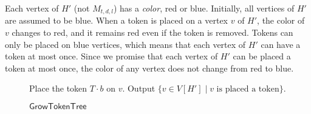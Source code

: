 \documentclass[runningheads]{llncs}
\theoremstyle{plain}
\theoremstyle{definition}
\begin{document}

Each vertex of $H'$ (not $M_{t, d, l}$) has a \emph{color}, red or blue. Initially, all vertices of $H'$ are assumed to be blue. When a token is placed on a vertex $v$ of $H'$, the color of $v$ changes to red, and it remains red even if the token is removed. Tokens can only be placed on blue vertices, which means that each vertex of $H'$ can have a token at most once. Since we promise that each vertex of $H'$ can be placed a token at most once, the color of any vertex does not change from red to blue.

\begin{comment}
\ifthenelse{\boolean{Draft}}{
\begin{figure}[t]
    \centering
    \texttt{[image: pic10.eps]}
    \caption{given $H$ with $d=2, l=2$ (left) and $t=1$, the construction of $H'$ (center) and $M_{t, d, l}$ (right). $H'$ is obtained by adding a complete directed $d$-ary tree (red part) connected to each root of $H$. Moreover, the labeling of $M_{t, d, l}$ is constructed recursively by appending one character to the right of the parent's label.}
    \label{fig:10}
\end{figure}
}
\end{comment}



\begin{figure}[!t]
\begin{algorithm}[H]
	\caption{$\mathsf{GrowTokenTree}$}
	\label{growtokentree}
	\begin{algorithmic}[1]
    \STATE Place the token $T \cdot b$ on $v$.
    \ENDWHILE
    \STATE Output $\{v \in V[H'] \mid v \text{ is placed a token}\}$.
	\end{algorithmic}
\end{algorithm}
\end{figure}
\end{document}
